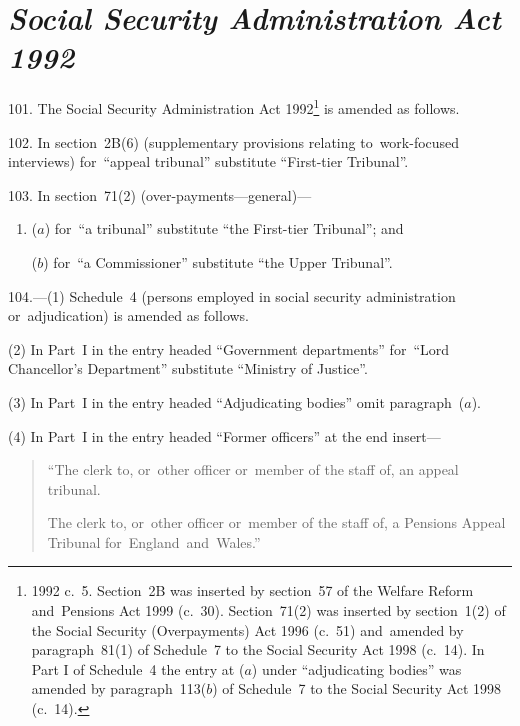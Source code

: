 \documentclass[12pt,a4paper]{article}
\begin{document}
\section*{\itshape Social Security Administration Act 1992}

101.  The Social Security Administration Act 1992\footnote{1992 c.~5. Section~2B was inserted by section~57 of the Welfare Reform and~Pensions Act 1999 (c.~30). Section~71(2) was inserted by section~1(2) of the Social Security (Overpayments) Act 1996 (c.~51) and~amended by paragraph~81(1) of Schedule~7 to the Social Security Act 1998 (c.~14). In Part I of Schedule~4 the entry at ($a$) under “adjudicating bodies” was amended by paragraph~113($b$) of Schedule~7 to the Social Security Act 1998 (c.~14).} is amended as follows.

\medskip

102.  In section~2B(6) (supplementary provisions relating to~work-focused interviews) for~“appeal tribunal” substitute “First-tier Tribunal”.

\medskip

103.  In section~71(2) (over-payments—general)—
\begin{enumerate}\item[]
($a$) for~“a tribunal” substitute “the First-tier Tribunal”; and

($b$) for~“a Commissioner” substitute “the Upper Tribunal”.
\end{enumerate}

\medskip

104.---(1)  Schedule~4 (persons employed in social security administration or~adjudication) is amended as follows.

(2) In Part~I in the entry headed “Government departments” for~“Lord Chancellor’s Department” substitute “Ministry of Justice”.

(3) In Part~I in the entry headed “Adjudicating bodies” omit paragraph~($a$).

(4) In Part~I in the entry headed “Former officers” at the end insert—
\begin{quotation}
“The clerk to, or~other officer or~member of the staff of, an appeal tribunal.

The clerk to, or~other officer or~member of the staff of, a Pensions Appeal Tribunal for~England~and~Wales.”
\end{quotation}
\end{document}
